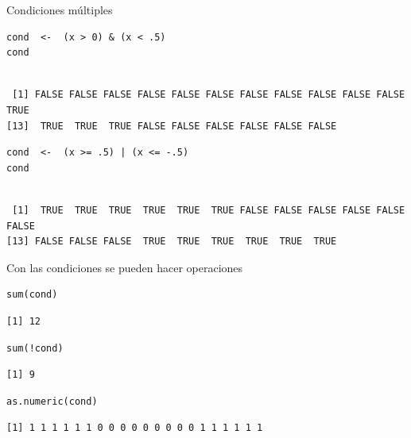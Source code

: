 \documentclass[aspectratio=169, usenames,svgnames,dvipsnames]{beamer}
\begin{document}
\begin{frame}[label={sec:org857d419},fragile]{Condiciones múltiples}
 \lstset{language=r,label= ,caption= ,captionpos=b,numbers=none}
\begin{lstlisting}
cond  <-  (x > 0) & (x < .5)
cond
\end{lstlisting}

\begin{verbatim}

 [1] FALSE FALSE FALSE FALSE FALSE FALSE FALSE FALSE FALSE FALSE FALSE  TRUE
[13]  TRUE  TRUE  TRUE FALSE FALSE FALSE FALSE FALSE FALSE
\end{verbatim}


\lstset{language=r,label= ,caption= ,captionpos=b,numbers=none}
\begin{lstlisting}
cond  <-  (x >= .5) | (x <= -.5)
cond
\end{lstlisting}

\begin{verbatim}

 [1]  TRUE  TRUE  TRUE  TRUE  TRUE  TRUE FALSE FALSE FALSE FALSE FALSE FALSE
[13] FALSE FALSE FALSE  TRUE  TRUE  TRUE  TRUE  TRUE  TRUE
\end{verbatim}
\end{frame}


\begin{frame}[label={sec:org60774b5},fragile]{Con las condiciones se pueden hacer operaciones}
 \lstset{language=r,label= ,caption= ,captionpos=b,numbers=none}
\begin{lstlisting}
sum(cond)
\end{lstlisting}

\begin{verbatim}
[1] 12
\end{verbatim}


\lstset{language=r,label= ,caption= ,captionpos=b,numbers=none}
\begin{lstlisting}
sum(!cond)
\end{lstlisting}

\begin{verbatim}
[1] 9
\end{verbatim}


\lstset{language=r,label= ,caption= ,captionpos=b,numbers=none}
\begin{lstlisting}
as.numeric(cond)
\end{lstlisting}

\begin{verbatim}
[1] 1 1 1 1 1 1 0 0 0 0 0 0 0 0 0 1 1 1 1 1 1
\end{verbatim}
\end{frame}
\end{document}
